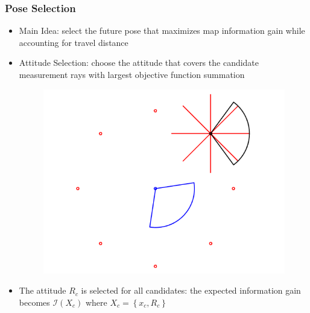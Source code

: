 \documentclass[11pt,professionalfonts,hyperref={pdftex,pdfpagemode=none,pdfstartview=FitH}]{beamer}
\newcommand{\braces}[1]{\ensuremath{\left\{ #1 \right\}}}
\begin{document}
\begin{frame}
\frametitle{Pose Selection}

\begin{itemize}
	\item Main Idea: select the future pose that maximizes map information gain while accounting for travel distance
	\vspace*{0.0cm}\pause
	\item Attitude Selection: choose the attitude that covers the candidate measurement rays with largest objective function summation
\begin{figure}
\centerline{
	\includegraphics[height=0.35\linewidth]{ExampleOptimalPose.png}
}
\vspace*{-0.05\linewidth}
\end{figure}
	\item The attitude $R_c$ is selected for all candidates: the expected information gain becomes $\mathcal I(X_c)$ where $X_c=\braces{x_c,R_c}$
\end{itemize}

\end{frame}
\end{document}
